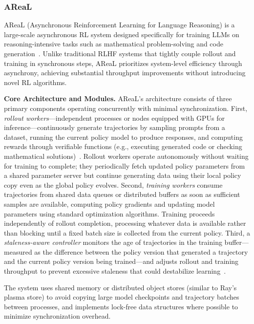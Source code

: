 \documentclass[conference]{IEEEtran}
\begin{document}
\subsubsection{AReaL}

AReaL (Asynchronous Reinforcement Learning for Language Reasoning) is a large-scale asynchronous RL system designed specifically for training LLMs on reasoning-intensive tasks such as mathematical problem-solving and code generation~\cite{areal-paper}. Unlike traditional RLHF systems that tightly couple rollout and training in synchronous steps, AReaL prioritizes system-level efficiency through asynchrony, achieving substantial throughput improvements without introducing novel RL algorithms.

\textbf{Core Architecture and Modules.} AReaL's architecture consists of three primary components operating concurrently with minimal synchronization. First, \textit{rollout workers}—independent processes or nodes equipped with GPUs for inference—continuously generate trajectories by sampling prompts from a dataset, running the current policy model to produce responses, and computing rewards through verifiable functions (e.g., executing generated code or checking mathematical solutions)~\cite{areal-paper}. Rollout workers operate autonomously without waiting for training to complete; they periodically fetch updated policy parameters from a shared parameter server but continue generating data using their local policy copy even as the global policy evolves. Second, \textit{training workers} consume trajectories from shared data queues or distributed buffers as soon as sufficient samples are available, computing policy gradients and updating model parameters using standard optimization algorithms. Training proceeds independently of rollout completion, processing whatever data is available rather than blocking until a fixed batch size is collected from the current policy. Third, a \textit{staleness-aware controller} monitors the age of trajectories in the training buffer—measured as the difference between the policy version that generated a trajectory and the current policy version being trained—and adjusts rollout and training throughput to prevent excessive staleness that could destabilize learning~\cite{areal-paper}.

The system uses shared memory or distributed object stores (similar to Ray's plasma store) to avoid copying large model checkpoints and trajectory batches between processes, and implements lock-free data structures where possible to minimize synchronization overhead.
\end{document}
